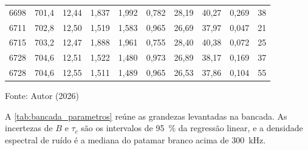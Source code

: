 \begin{table}[H]
\begin{tabular}{rrrrrrrrrr}
        6698 & 701{,}4 & 12{,}44 & 1{,}837 & 1{,}992 & 0{,}782 & 28{,}19 & 40{,}27 & 0{,}269 & 38 \\
        6711 & 702{,}8 & 12{,}50 & 1{,}519 & 1{,}583 & 0{,}965 & 26{,}69 & 37{,}97 & 0{,}047 & 21 \\
        6715 & 703{,}2 & 12{,}47 & 1{,}888 & 1{,}961 & 0{,}755 & 28{,}40 & 40{,}38 & 0{,}072 & 25 \\
        6728 & 704{,}6 & 12{,}51 & 1{,}522 & 1{,}480 & 0{,}973 & 26{,}89 & 38{,}17 & 0{,}169 & 37 \\
        6728 & 704{,}6 & 12{,}55 & 1{,}511 & 1{,}489 & 0{,}965 & 26{,}53 & 37{,}86 & 0{,}104 & 55 \\
        \bottomrule
    \end{tabular}


    \vspace{2pt}
    {\small Fonte: Autor (2026)}
\end{table}

A \autoref{tab:bancada_parametros} reúne as grandezas levantadas na
bancada. As incertezas de $B$ e $\tau_c$ são os intervalos de
\SI{95}{\percent} da regressão linear, e a densidade espectral de ruído é a
mediana do patamar branco acima de \SI{300}{\kilo\hertz}.


